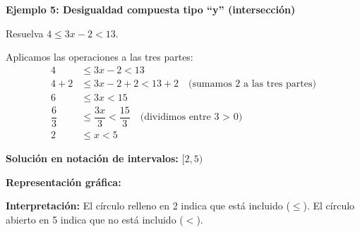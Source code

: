 \begin{example}
\textbf{Ejemplo 5: Desigualdad compuesta tipo ``y'' (intersección)}

Resuelva $4 \le 3x - 2 < 13$.

\solution

Aplicamos las operaciones a las tres partes:
\begin{align*}
4 &\le 3x - 2 < 13 \\
4 + 2 &\le 3x - 2 + 2 < 13 + 2 \quad \text{(sumamos 2 a las tres partes)} \\
6 &\le 3x < 15 \\
\dfrac{6}{3} &\le \dfrac{3x}{3} < \dfrac{15}{3} \quad \text{(dividimos entre 3 > 0)} \\
2 &\le x < 5
\end{align*}

\textbf{Solución en notación de intervalos:} $[2, 5)$

\textbf{Representación gráfica:}

\begin{center}
\end{center}

\textbf{Interpretación:} El círculo relleno en 2 indica que está incluido ($\le$). El círculo abierto en 5 indica que no está incluido ($<$).
\end{example}

\newpage

